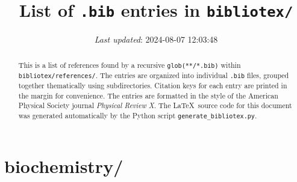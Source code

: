 \documentclass[letterpaper, 10pt, oneside, openany]{report}
\title{List of \texttt{.bib} entries in \texttt{bibliotex/}}
\date{\textit{Last updated}: 2024-08-07 12:03:48}
\begin{document}
\maketitle

\begin{abstract}
	This is a list of references found by a recursive \texttt{glob(**/*.bib)} within \texttt{bibliotex/references/}.
	The entries are organized into individual \texttt{.bib} files, grouped together thematically using subdirectories.
	Citation keys for each entry are printed in the margin for convenience.
	The entries are formatted in the style of the American Physical Society journal \emph{Physical Review X}.
	The \LaTeX\ source code for this document was generated automatically by the Python script \texttt{generate\_bibliotex.py}.
\end{abstract}

\tableofcontents

\chapter*{biochemistry/}

\begin{refsection}
	\nocite{*}
	\printbibliography[title = {Li-ATP.bib}, heading = subbibintoc]
\end{refsection}

\begin{refsection}
	\nocite{*}
	\printbibliography[title = {Mg-ATP.bib}, heading = subbibintoc]
\end{refsection}

\begin{refsection}
	\nocite{*}
	\printbibliography[title = {Mg-DNA.bib}, heading = subbibintoc]
\end{refsection}

\begin{refsection}
	\nocite{*}
	\printbibliography[title = {Mg-OAc.bib}, heading = subbibintoc]
\end{refsection}

\begin{refsection}
	\nocite{*}
	\printbibliography[title = {Mg.bib}, heading = subbibintoc]
\end{refsection}

\begin{refsection}
	\nocite{*}
	\printbibliography[title = {misc.bib}, heading = subbibintoc]
\end{refsection}
\end{document}
